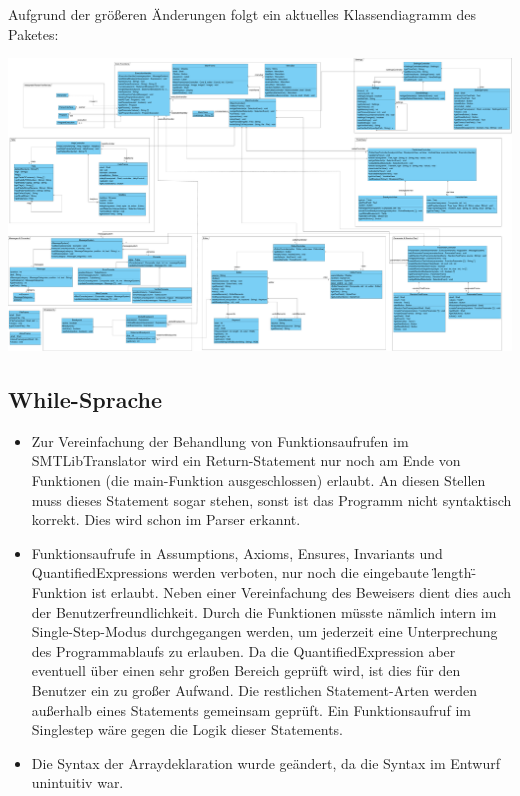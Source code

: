 Aufgrund der gr\"{o}\ss eren \"{A}nderungen folgt ein aktuelles Klassendiagramm des Paketes:\\
\begin{landscape}
\includegraphics[width=0.85\paperheight]{images/coregui.pdf}
\end{landscape}
\subsection{While-Sprache}
\begin{itemize}
\item Zur Vereinfachung der Behandlung von Funktionsaufrufen im SMTLibTranslator wird ein Return-Statement nur noch am Ende von Funktionen (die main-Funktion ausgeschlossen) erlaubt.
An diesen Stellen muss dieses Statement sogar stehen, sonst ist das Programm nicht syntaktisch korrekt. Dies wird schon im Parser erkannt.
\item Funktionsaufrufe in Assumptions, Axioms, Ensures, Invariants und QuantifiedExpressions werden verboten, nur noch die eingebaute \"length\"-Funktion ist erlaubt. 
Neben einer Vereinfachung des Beweisers dient dies auch der Benutzerfreundlichkeit. 
Durch die Funktionen müsste nämlich intern im Single-Step-Modus durchgegangen werden, um jederzeit eine Unterprechung des Programmablaufs zu erlauben.
Da die QuantifiedExpression aber eventuell über einen sehr großen Bereich geprüft wird, ist dies für den Benutzer ein zu großer Aufwand. Die restlichen Statement-Arten
werden außerhalb eines Statements gemeinsam geprüft. Ein Funktionsaufruf im Singlestep wäre gegen die Logik dieser Statements.
\item Die Syntax der Arraydeklaration wurde geändert, da die Syntax im Entwurf unintuitiv war.
\end{itemize}